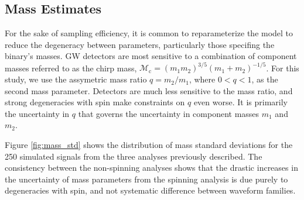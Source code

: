 \subsection{Mass Estimates}

For the sake of sampling efficiency, it is common to reparameterize the model to reduce the degeneracy between parameters, particularly those specifing the binary's masses.  GW detectors are most sensitive to a combination of component masses referred to as the chirp mass, $\mathcal{M}_\mathrm{c} = (m_1 m_2)^{3/5} (m_1 + m_2)^{-1/5}$.  For this study, we use the assymetric mass ratio $q = m_2/m_1$, where $0 < q < 1$, as the second mass parameter.  Detectors are much less sensitive to the mass ratio, and strong degeneracies with spin make constraints on $q$ even worse.  It is primarily the uncertainty in $q$ that governs the uncertainty in component masses $m_1$ and $m_2$.

Figure \ref{fig:mass_std} shows the distribution of mass standard deviations for the 250 simulated signals from the three analyses previously described.  The consistency between the non-spinning analyses shows that the drastic increases in the uncertainty of mass parameters from the spinning analysis is due purely to degeneracies with spin, and not systematic difference between waveform families.